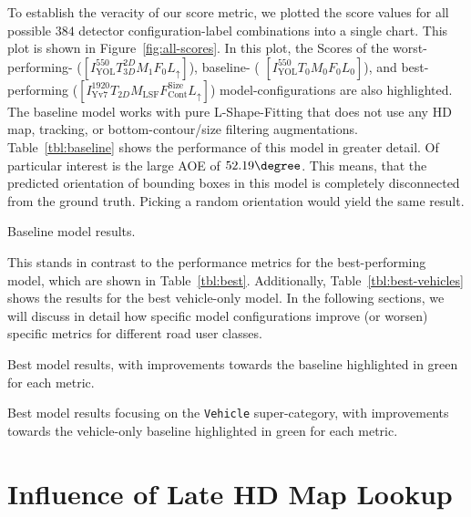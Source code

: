 To establish the veracity of our score metric, we plotted the score values for all possible $384$ detector configuration-label combinations into a single chart.
This plot is shown in Figure~\ref{fig:all-scores}.
In this plot, the Scores of the worst-performing- ($\left[I^{550}_\text{YOL}T^{2D}_{3D}M_1F_0L_{\uparrow}\right]$), baseline- ( $\left[I^{550}_\text{YOL}T_0M_0F_0L_0\right]$), and best-performing ($\left[I^{1920}_\text{Yv7}T_{2D}M_\text{LSF}F_\text{Cont}^\text{Size}L_{\uparrow}\right]$) model-configurations are also highlighted.
The baseline model works with pure L-Shape-Fitting that does not use any HD map, tracking, or bottom-contour/size filtering augmentations.
Table~\ref{tbl:baseline} shows the performance of this model in greater detail.
Of particular interest is the large AOE of $52.19\degree$.
This means, that the predicted orientation of bounding boxes in this model is  completely disconnected from the ground truth.
Picking a random orientation would yield the same result.

\begin{table}[htbp]
    
    \caption{Baseline model results.}
    \label{tbl:baseline}
\end{table}

This stands in contrast to the performance metrics for the best-performing model, which are shown in Table~\ref{tbl:best}.
Additionally, Table~\ref{tbl:best-vehicles} shows the results for the best vehicle-only model.
In the following sections, we will discuss in detail how specific model configurations improve (or worsen) specific metrics for different road user classes.

\begin{table}[htbp]
    
    \caption{Best model results, with improvements towards the baseline highlighted in green for each metric.}
    \label{tbl:best}
\end{table}

\begin{table}[htbp]
    
    \caption{Best model results focusing on the \texttt{Vehicle} super-category, with improvements towards the vehicle-only baseline highlighted in green for each metric.}
    \label{tbl:best-vehicles}
\end{table}


\section{Influence of Late HD Map Lookup}
\label{sec:impactlatemap}

